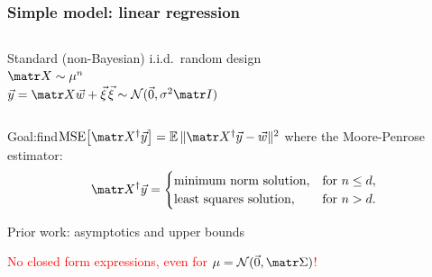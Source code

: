 \begin{frame}
  \frametitle{Simple model: linear regression}
  \begin{columns}
    \begin{column}{0.5\textwidth}
      \vspace{2mm}
      
      Standard (non-Bayesian) i.i.d.~random design\\
$\X\sim\mu^n$\\
$\y=\X\w+\xib$\qquad$\xib\sim\Nc(\vec{0},\sigma^2\I)$
    \end{column}
    \begin{column}{0.4\textwidth}
    \end{column}
  \end{columns}
  
  \pause
  
  Goal:\quad find\quad$\MSE{\X^\dagger\y}=\E\,\|\X^\dagger\y-\w\|^2$ where
  the
  Moore-Penrose estimator:
  \begin{align*}
    \X^\dagger\y =
      \begin{cases}
        \text{minimum norm solution},& \text{for }n\leq d,\\
        \text{least squares solution},& \text{for }n>d.
      \end{cases}
  \end{align*}
  
  \pause

    Prior work: asymptotics \parencite{HMRT19_TR} and upper bounds
    \parencite{BLLT19_TR}
    
  \textcolor{red}{No closed form expressions, even for
    $\mu=\Nc(\vec{0},\Sigmab)$!}
\end{frame}

